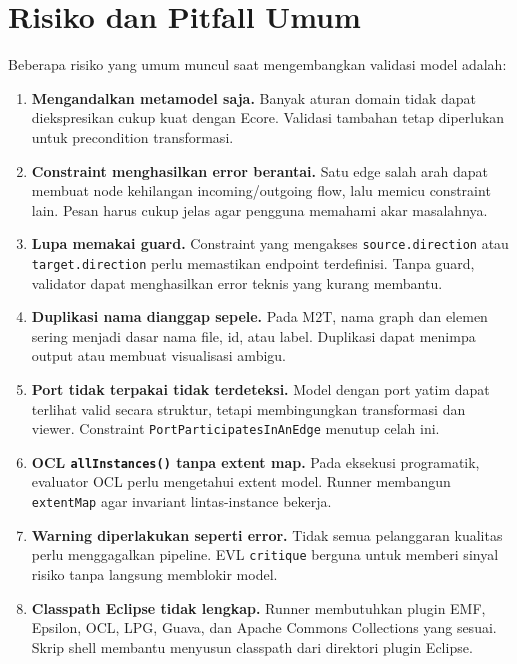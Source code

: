 \section{Risiko dan Pitfall Umum}

Beberapa risiko yang umum muncul saat mengembangkan validasi model adalah:
\begin{enumerate}
  \item \textbf{Mengandalkan metamodel saja.} Banyak aturan domain tidak dapat diekspresikan cukup kuat dengan Ecore. Validasi tambahan tetap diperlukan untuk precondition transformasi.

  \item \textbf{Constraint menghasilkan error berantai.} Satu edge salah arah dapat membuat node kehilangan incoming/outgoing flow, lalu memicu constraint lain. Pesan harus cukup jelas agar pengguna memahami akar masalahnya.

  \item \textbf{Lupa memakai guard.} Constraint yang mengakses \texttt{source.direction} atau \texttt{target.direction} perlu memastikan endpoint terdefinisi. Tanpa guard, validator dapat menghasilkan error teknis yang kurang membantu.

  \item \textbf{Duplikasi nama dianggap sepele.} Pada M2T, nama graph dan elemen sering menjadi dasar nama file, id, atau label. Duplikasi dapat menimpa output atau membuat visualisasi ambigu.

  \item \textbf{Port tidak terpakai tidak terdeteksi.} Model dengan port yatim dapat terlihat valid secara struktur, tetapi membingungkan transformasi dan viewer. Constraint \texttt{PortParticipatesInAnEdge} menutup celah ini.

  \item \textbf{OCL \texttt{allInstances()} tanpa extent map.} Pada eksekusi programatik, evaluator OCL perlu mengetahui extent model. Runner membangun \texttt{extentMap} agar invariant lintas-instance bekerja.

  \item \textbf{Warning diperlakukan seperti error.} Tidak semua pelanggaran kualitas perlu menggagalkan pipeline. EVL \texttt{critique} berguna untuk memberi sinyal risiko tanpa langsung memblokir model.

  \item \textbf{Classpath Eclipse tidak lengkap.} Runner membutuhkan plugin EMF, Epsilon, OCL, LPG, Guava, dan Apache Commons Collections yang sesuai. Skrip shell membantu menyusun classpath dari direktori plugin Eclipse.
\end{enumerate}

